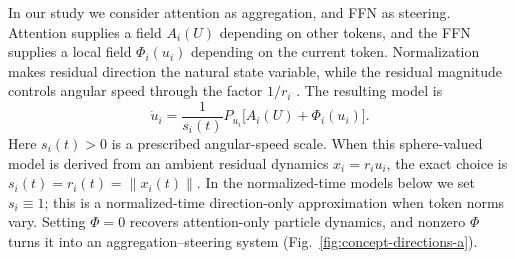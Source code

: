 \documentclass[11pt]{article}
\begin{document}
In our study we consider attention as aggregation, and FFN as steering.
Attention supplies a field $A_i(U)$ depending on other tokens, and the FFN supplies a
local field $\Phi_i(u_i)$ depending on the current token. Normalization makes
residual direction the natural state variable, while the residual magnitude
controls angular speed through the factor $1/r_i$
\citep{xiong2020layernorm,zhang2019rmsnorm,karagodin2025normalization}. The resulting model is
\begin{equation}
\dot u_i=\frac1{s_i(t)}P_{u_i}\big[A_i(U)+\Phi_i(u_i)\big].
\label{eq:flow}
\end{equation}
Here $s_i(t)>0$ is a prescribed angular-speed scale. When this sphere-valued
model is derived from an ambient residual dynamics $x_i=r_i u_i$, the exact
choice is $s_i(t)=r_i(t)=\|x_i(t)\|$. In the normalized-time models below we
set $s_i\equiv1$; this is a normalized-time direction-only approximation when
token norms vary. Setting $\Phi=0$ recovers attention-only particle dynamics, and nonzero
$\Phi$ turns it into an aggregation--steering system (Fig.~\ref{fig:concept-directions-a}). 
\end{document}

